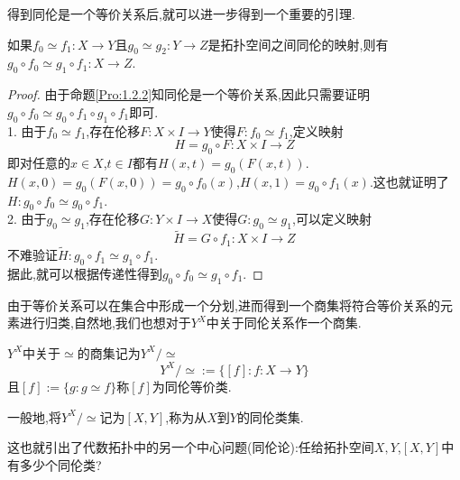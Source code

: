 \documentclass{article}
\begin{document}
得到同伦是一个等价关系后,就可以进一步得到一个重要的引理.
\begin{lemma}
    如果$f_0 \simeq f_1:X\to Y$且$g_0 \simeq g_2 : Y \to Z$是拓扑空间之间同伦的映射,则有$g_0 \circ f_0 \simeq g_1 \circ f_1 : X \to Z$.
    \label{lem:1.2.3}
\end{lemma}

\begin{proof}
    由于命题\ref{Pro:1.2.2}知同伦是一个等价关系,因此只需要证明$g_0 \circ f_0 \simeq g_0 \circ f_1 \circ g_1 \circ f_1$即可.\\
    1. 由于$f_0 \simeq f_1$,存在伦移$F : X \times I \to Y$使得$F : f_0 \simeq f_1$,定义映射
    $$
    H = g_0 \circ F : X \times I \to Z
    $$
    即对任意的$x \in X$,$t \in I$都有$H(x,t) = g_0(F(x,t))$.$H(x,0) = g_0(F(x,0)) = g_0 \circ f_0(x)$,$H(x,1) = g_0 \circ f_1(x)$.这也就证明了$H: g_0 \circ f_0 \simeq g_0 \circ f_1$.\\
    2. 由于$g_0 \simeq g_1$,存在伦移$G : Y \times I \to X$使得$G : g_0 \simeq g_1$,可以定义映射
    $$
    \tilde{H} = G \circ f_1: X \times I \to Z
    $$
    不难验证$\tilde{H}: g_0 \circ f_1 \simeq g_1 \circ f_1$.\\
    据此,就可以根据传递性得到$g_0 \circ f_0 \simeq g_1 \circ f_1$.
\end{proof}

由于等价关系可以在集合中形成一个分划,进而得到一个商集将符合等价关系的元素进行归类,自然地,我们也想对于$Y^X$中关于同伦关系作一个商集.
\begin{definition}
    $Y^X$中关于$\simeq$的商集记为$Y^X / \simeq$
    $$
    Y^X/\simeq := \{[f]: f: X \to Y\}
    $$
    且$[f] := \{g : g \simeq f\}$称$[f]$为同伦等价类.


    一般地,将$Y^X/\simeq$记为$[X,Y]$,称为从$X$到$Y$的同伦类集.
    \label{Def:1.2.2}
\end{definition}

这也就引出了代数拓扑中的另一个中心问题(同伦论):任给拓扑空间$X,Y$,$[X,Y]$中有多少个同伦类?
\end{document}
